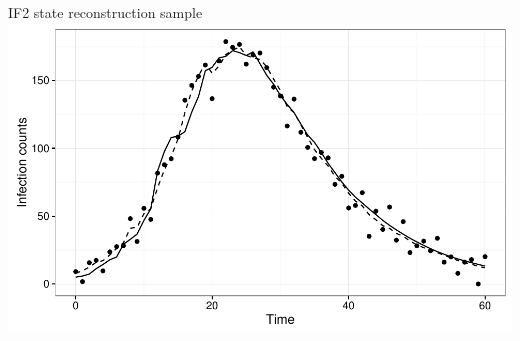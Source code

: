 \documentclass[12pt]{beamer}
\begin{document}
\begin{frame}
\begin{columns}
\begin{column}{0.5\textwidth}
\begin{algorithm}[H]
{{			        }


			    }


		    \end{algorithm}

		\end{column}
	\end{columns}

\end{frame}

\begin{frame}

	\null
	\vfill
	IF2 state reconstruction sample \\
	\vspace{\baselineskip}
	\includegraphics[width=\textwidth,height=\textheight,keepaspectratio=true]{../../writing/SC1/images/if2state}
	\vfill

\end{frame}
\end{document}
